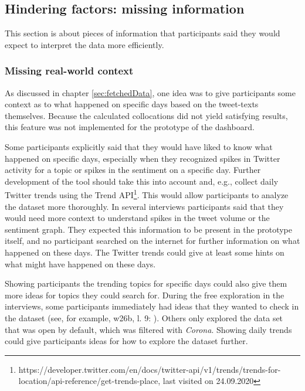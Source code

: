 \subsection{Hindering factors: missing information}
This section is about pieces of information that participants said they would expect to interpret the data more efficiently. 

\subsubsection*{Missing real-world context}
As discussed in chapter \ref{sec:fetchedData}, one idea was to give participants some context as to what happened on specific days based on the tweet-texts themselves. Because the calculated collocations did not yield satisfying results, this feature was not implemented for the prototype of the dashboard.

Some participants explicitly said that they would have liked to know what happened on specific days, especially when they recognized spikes in Twitter activity for a topic or spikes in the sentiment on a specific day. Further development of the tool should take this into account and, e.g., collect daily Twitter trends using the Trend API\footnote{https://developer.twitter.com/en/docs/twitter-api/v1/trends/trends-for-location/api-reference/get-trends-place, last visited on 24.09.2020}. This would allow participants to analyze the dataset more thoroughly. In several interviews participants said that they would need more context to understand spikes in the tweet volume or the sentiment graph. They expected this information to be present in the prototype itself, and no participant searched on the internet for further information on what happened on these days. The Twitter trends could give at least some hints on what might have happened on these days.

Showing participants the trending topics for specific days could also give them more ideas for topics they could search for. During the free exploration in the interviews, some participants immediately had ideas that they wanted to check in the dataset (see, for example, w26b, l. 9: ). Others only explored the data set that was open by default, which was filtered with \emph{Corona}. Showing daily trends could give participants ideas for how to explore the dataset further.

